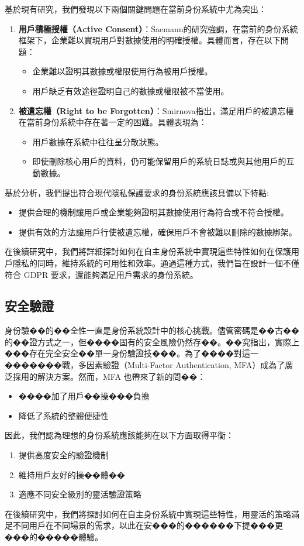 基於現有研究，我們發現以下兩個關鍵問題在當前身份系統中尤為突出：
\begin{enumerate}
  \item \textbf{用戶積極授權（Active Consent）}：Saemann\cite{saemann2022investigating}的研究強調，在當前的身份系統框架下，企業難以實現用戶對數據使用的明確授權。具體而言，存在以下問題：
        \begin{itemize}
          \item 企業難以證明其數據或權限使用行為被用戶授權。
          \item 用戶缺乏有效途徑證明自己的數據或權限被不當使用。
        \end{itemize}
  \item \textbf{被遺忘權（Right to be Forgotten）}：Smirnova\cite{smirnova2024understanding}指出，滿足用戶的被遺忘權在當前身份系統中存在著一定的困難。具體表現為：
        \begin{itemize}
          \item 用戶數據在系統中往往呈分散狀態。
          \item 即使刪除核心用戶的資料，仍可能保留用戶的系統日誌或與其他用戶的互動數據。
        \end{itemize}
\end{enumerate}
基於分析，我們提出符合現代隱私保護要求的身份系統應該具備以下特點:
\begin{itemize}
  \item 提供合理的機制讓用戶或企業能夠證明其數據使用行為符合或不符合授權。
  \item 提供有效的方法讓用戶行使被遺忘權，確保用戶不會被難以刪除的數據綁架。
\end{itemize}
在後續研究中，我們將詳細探討如何在自主身份系統中實現這些特性如何在保護用戶隱私的同時，維持系統的可用性和效率。通過這種方式，我們旨在設計一個不僅符合 GDPR 要求，還能夠滿足用戶需求的身份系統。
\subsection{安全驗證}
身份驗��的��全性一直是身份系統設計中的核心挑戰。儘管密碼是��古��的��證方式之一，但����固有的安全風險仍然存��。��究\cite{6234436}指出，實際上���存在完全安全��單一身份驗證技���。為了����對這一�������戰，多因素驗證（Multi-Factor Authentication, MFA）成為了廣泛採用的解決方案。然而，MFA 也帶來了新的問��：
\begin{itemize}
  \item ����加了用戶��操���負擔
  \item 降低了系統的整體便捷性
\end{itemize}
因此，我們認為理想的身份系統應該能夠在以下方面取得平衡：
\begin{enumerate}
  \item 提供高度安全的驗證機制
  \item 維持用戶友好的操��體��
  \item 適應不同安全級別的靈活驗證策略
\end{enumerate}
在後續研究中，我們將探討如何在自主身份系統中實現這些特性，用靈活的策略滿足不同用戶在不同場景的需求，以此在安���的������下提���更���的�����體驗。
